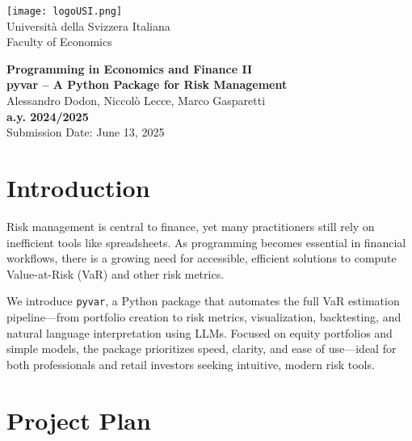 \documentclass{article}
\date{}
\begin{document}
\begin{titlepage}
\centering
\texttt{[image: logoUSI.png]}\\[1.5cm]

{\LARGE Università della Svizzera Italiana} \\[1.5em]
{\LARGE Faculty of Economics} \\[3em]

\vspace{1.5cm}

{\huge\bfseries Programming in Economics and Finance II} \\[2.5em]
{\LARGE\bfseries pyvar – A Python Package for Risk Management} \\[4.5em]

{\LARGE Alessandro Dodon, Niccolò Lecce, Marco Gasparetti} \\[3em]

{\LARGE\bfseries a.y. 2024/2025} \\[1.5em]
{\LARGE Submission Date: June 13, 2025} \\

\end{titlepage}


\tableofcontents
\clearpage %



\section{Introduction}

Risk management is central to finance, yet many practitioners still rely on inefficient tools like spreadsheets. As programming becomes essential in financial workflows, there is a growing need for accessible, efficient solutions to compute Value-at-Risk (VaR) and other risk metrics.

We introduce \texttt{pyvar}, a Python package that automates the full VaR estimation pipeline—from portfolio creation to risk metrics, visualization, backtesting, and natural language interpretation using LLMs. Focused on equity portfolios and simple models, the package prioritizes speed, clarity, and ease of use—ideal for both professionals and retail investors seeking intuitive, modern risk tools.


\section{Project Plan}
\end{document}
